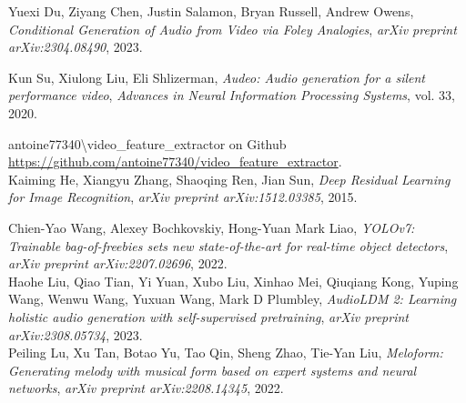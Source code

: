 \documentclass[conference]{IEEEtran}
\begin{document}
\begin{thebibliography}{00}

        Yuexi Du, Ziyang Chen, Justin Salamon, Bryan Russell, Andrew Owens,
        \emph{Conditional Generation of Audio from Video via Foley Analogies},
        \emph{arXiv preprint arXiv:2304.08490},
        2023.

        Kun Su, Xiulong Liu, Eli Shlizerman,
        \emph{Audeo: Audio generation for a silent performance video},
        \emph{Advances in Neural Information Processing Systems},
        vol. 33,
        2020.


     antoine77340\textbackslash video\_feature\_extractor on Github \url{https://github.com/antoine77340/video_feature_extractor}. \\
    
        Kaiming He, Xiangyu Zhang, Shaoqing Ren, Jian Sun,
        \emph{Deep Residual Learning for Image Recognition},
        \emph{arXiv preprint arXiv:1512.03385},
        2015.

    
        Chien-Yao Wang, Alexey Bochkovskiy, Hong-Yuan Mark Liao,
        \emph{YOLOv7: Trainable bag-of-freebies sets new state-of-the-art for real-time object detectors},
        \emph{arXiv preprint arXiv:2207.02696},
        2022. \\
    
        Haohe Liu, Qiao Tian, Yi Yuan, Xubo Liu, Xinhao Mei, Qiuqiang Kong, Yuping Wang, Wenwu Wang, Yuxuan Wang, Mark D Plumbley,
        \emph{AudioLDM 2: Learning holistic audio generation with self-supervised pretraining},
        \emph{arXiv preprint arXiv:2308.05734},
        2023. \\

        Peiling Lu, Xu Tan, Botao Yu, Tao Qin, Sheng Zhao, Tie-Yan Liu,
        \emph{Meloform: Generating melody with musical form based on expert systems and neural networks},
        \emph{arXiv preprint arXiv:2208.14345},
        2022.
      

\end{thebibliography}
\end{document}
